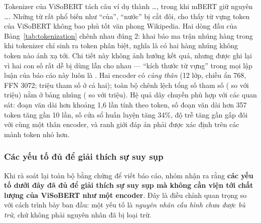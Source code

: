 \noindent Tokenizer của ViSoBERT tách câu ví dụ thành
 \dots{}, trong khi mBERT giữ nguyên
 \dots{}. Những từ rất phổ biến như ``của'', ``nước'' bị cắt
đôi, cho thấy từ vựng \tokVocabViso{} token của ViSoBERT không bao phủ tốt văn phong Wikipedia.
Hai dòng đầu của Bảng~\ref{tab:tokenization} chênh nhau đúng 2:  khai
báo ma trận nhúng \tokEmbRowsViso{} hàng trong khi tokenizer chỉ sinh ra \tokVocabViso{} token
phân biệt, nghĩa là có hai hàng nhúng không token nào ánh xạ tới. Chi tiết này không ảnh hưởng
kết quả, nhưng được ghi lại vì hai con số rất dễ bị dùng lẫn cho nhau --- ``kích thước từ vựng''
trong mọi lập luận của báo cáo này luôn là \tokVocabViso. Hai encoder có \emph{cùng thân}
(12 lớp, chiều ẩn 768, FFN 3072; \tokBodyParamsViso{} triệu tham số ở cả hai); toàn bộ chênh lệch
tổng số tham số (\tokParamsViso{} so với \tokParamsMbert{} triệu) nằm ở bảng nhúng
(\tokEmbParamsViso{} so với \tokEmbParamsMbert{} triệu). Hệ quả dây chuyền phù hợp với các quan
sát: đoạn văn dài hơn khoảng 1,6 lần tính theo token, số đoạn văn dài hơn 357 token tăng gần 10
lần, số cửa sổ huấn luyện tăng 34\%, độ trễ tăng gần gấp đôi với cùng một thân encoder, và ranh
giới đáp án phải được xác định trên các mảnh token nhỏ hơn.

\subsubsection{Các yếu tố đủ để giải thích sự suy sụp}
\label{sec:visobert-factors}

Khi rà soát lại toàn bộ bằng chứng để viết báo cáo, nhóm nhận ra rằng \textbf{các yếu tố dưới đây
đã đủ để giải thích sự suy sụp mà không cần viện tới chất lượng của ViSoBERT như một encoder}.
Đây là điều chỉnh quan trọng so với cách trình bày ban đầu: một yếu tố là \emph{nguyên nhân cấu
hình chưa được bù trừ}, chứ không phải nguyên nhân đã bị loại trừ.

